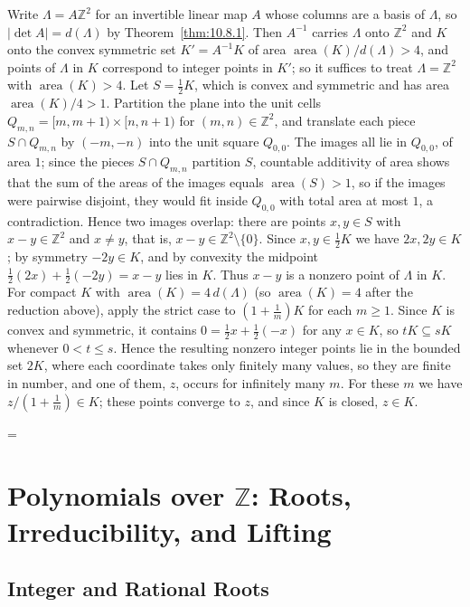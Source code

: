 \documentclass[11pt]{article}
\makeatletter
\theoremstyle{ntstyle}
\let\nt@closedisplay\]
\def\nt@guardedclose{\@ifnextchar\par{\nt@closeafterpar}{\@ifnextchar\end{\postdisplaypenalty\@M\nt@closedisplay}{\nt@closedisplay}}}
\def\nt@closeafterpar\par{\@ifnextchar\par{\nt@closeafterpar}{\@ifnextchar\end{\postdisplaypenalty\@M\nt@closedisplay\par}{\nt@closedisplay\par}}}
\renewenvironment{proof}[1][\proofname]{\par
  \pushQED{\qed}\normalfont\topsep\medskipamount\edef\nt@afterproof{\@endparpenalty=\the\@endparpenalty\relax}\@beginparpenalty\@M\@endparpenalty\@M\let\]\nt@guardedclose\trivlist\item[]\textit{#1\@addpunct{.}} \ignorespaces}{\ifvmode\addpenalty\@M\fi\popQED\nt@afterproof\endtrivlist\@endpefalse}
\DeclareMathOperator{\area}{area}
\makeatother
\begin{document}
\begin{proof} Write $\Lambda=A\mathbb{Z}^2$ for an
	invertible linear map $A$ whose columns are a basis of $\Lambda$, so
	$|\det A|=d(\Lambda)$ by Theorem~\ref{thm:10.8.1}. Then $A^{-1}$ carries $\Lambda$ onto
	$\mathbb{Z}^2$ and $K$ onto the convex symmetric set $K'=A^{-1}K$ of
	area $\area(K)/d(\Lambda)>4$, and points of $\Lambda$
	in $K$ correspond to integer points in $K'$; so it suffices to treat
	$\Lambda=\mathbb{Z}^2$ with $\area(K)>4$. Let
	$S=\tfrac{1}{2}K$, which is convex and symmetric and has area
	$\area(K)/4>1$. Partition the plane into the unit cells
	$Q_{m,n}=[m,m+1)\times[n,n+1)$ for $(m,n)\in\mathbb{Z}^2$, and
	translate each piece $S\cap Q_{m,n}$ by $(-m,-n)$ into the unit
	square $Q_{0,0}$. The images all lie in $Q_{0,0}$, of area $1$; since the pieces $S\cap Q_{m,n}$ partition $S$, countable additivity of area shows that the sum of the areas of the images equals $\area(S)>1$, so if the images were pairwise disjoint, they would fit inside $Q_{0,0}$ with total area at most $1$, a contradiction. Hence two images overlap:
	there are points $x,y\in S$ with $x-y\in\mathbb{Z}^2$ and $x\neq y$,
	that is, $x-y\in\mathbb{Z}^2\setminus\{0\}$. Since $x,y\in\tfrac{1}{2}K$ we
	have $2x,2y\in K$; by symmetry $-2y\in K$, and by convexity the
	midpoint $\tfrac{1}{2}(2x)+\tfrac{1}{2}(-2y)=x-y$ lies in $K$. Thus $x-y$ is
	a nonzero point of $\Lambda$ in $K$. For compact $K$ with
	$\area(K)=4\,d(\Lambda)$ (so $\area(K)=4$ after the reduction above), apply the strict case to
	$(1+\tfrac{1}{m})K$ for each $m\ge1$. Since $K$ is convex and symmetric,
	it contains $0=\tfrac12x+\tfrac12(-x)$ for any $x\in K$, so $tK\subseteq sK$
	whenever $0<t\le s$. Hence the resulting nonzero integer points lie in the
	bounded set $2K$, where each coordinate takes only finitely many values,
	so they are finite in number, and one of them, $z$, occurs for infinitely
	many $m$. For these $m$ we have $z/(1+\tfrac{1}{m})\in K$; these points
	converge to $z$, and since $K$ is closed, $z\in K$.

\end{proof}
\clearpage

\section{Polynomials over \texorpdfstring{$\mathbb{Z}$}{Z}: Roots, Irreducibility, and Lifting}

\subsection{Integer and Rational Roots}
\end{document}
